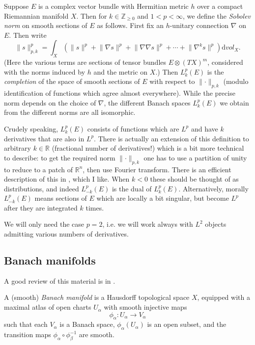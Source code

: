 \documentclass[12pt,letterpaper,reqno]{article}
\numberwithin{equation}{section}
\newcommand{\R}{\ensuremath{\mathbb R}}
\newcommand{\Z}{\ensuremath{\mathbb Z}}
\newcommand{\de}{\mathrm{d}}
\newcommand{\norm}[1]{\lVert#1\rVert}
\newcommand{\ti}[1]{\textit{#1}}
\begin{document}
\begin{example} Suppose $E$ is a complex
vector bundle with Hermitian metric $h$
over a compact Riemannian manifold $X$. Then for $k \in \Z_{\ge 0}$ and
$1 < p < \infty$, we define the \ti{Sobolev norm}
on smooth sections of $E$ as follows.
First fix an $h$-unitary connection $\nabla$ on $E$.
Then write
\begin{equation}
  \norm{s}^p_{p,k} = \int_X \left(\norm{s}^p + \norm{\nabla s}^p + \norm {\nabla \nabla s}^p +
    \cdots + \norm{\nabla^k s}^p\right) \de vol_X.
\end{equation}
(Here the various terms are sections of tensor bundles $E \otimes (TX)^m$,
considered with the norms induced by $h$ and the metric on $X$.)
Then $L^p_k(E)$ is the \ti{completion} of the space of smooth
sections of $E$ with respect to $\norm{\cdot}_{p,k}$ (modulo identification
of functions which agree almost everywhere).
While the precise norm depends on the choice of $\nabla$, the
different Banach spaces $L^p_k(E)$ we obtain from the different
norms are all isomorphic.
\end{example}

Crudely speaking, $L^p_k(E)$ consists of functions which are $L^p$ and
have $k$ derivatives that are also in $L^p$.
There is actually an extension of this definition to arbitrary $k \in \R$
(fractional number of derivatives!) which is a bit more technical to describe:
to get the required norm $\norm{\cdot}_{p,k}$
one has to use a partition of unity to reduce to a patch of $\R^n$,
then use Fourier transform. There is an efficient description of this in
\cite{MR2359489}, which I like. When $k<0$ these should be thought of
as distributions, and indeed $L^p_{-k}(E)$ is the dual of
$L^p_k(E)$.
Alternatively, morally $L^p_{-k}(E)$ means sections of $E$
which are locally a bit singular, but become $L^p$ after they
are integrated $k$ times.

We will only need the case $p=2$, i.e. we will work always with
$L^2$ objects admitting various numbers of derivatives.


\subsection{Banach manifolds}

A good review of this material is in \cite{MR0158410}.

\begin{defn} A (smooth) \ti{Banach manifold} is
a Hausdorff topological space $X$, equipped with a maximal
atlas of open charts $U_\alpha$ with smooth injective maps
\begin{equation}
  \phi_\alpha: U_\alpha \to V_\alpha
\end{equation}
such that each $V_\alpha$ is a Banach space, $\phi_\alpha(U_\alpha)$
is an open subset, and the transition maps $\phi_\alpha \circ \phi_\beta^{-1}$
are smooth.
\end{defn}
\end{document}
